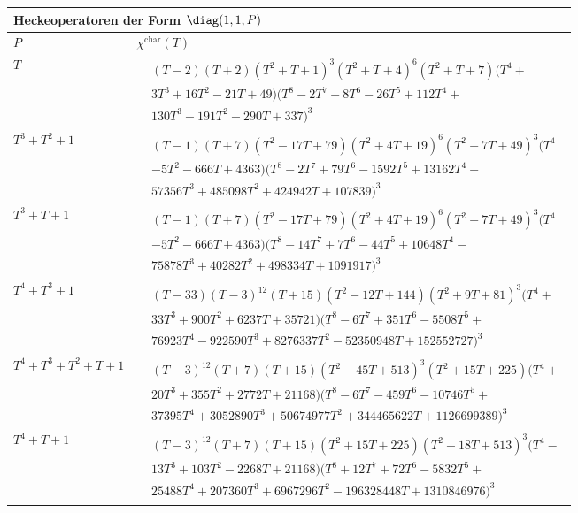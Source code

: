 \begin{tabular}{| l | l |}
\multicolumn{2}{l}{\bf Heckeoperatoren der Form $\diag(1,1,P)$} \\
\hline
$P$ & $\chi^\text{char}(T)$ \\
\hline
$T$ &
$\!\begin{aligned}
	&(T - 2)(T + 2)(T^{2} + T + 1)^{3}(T^{2} + T + 4)^{6}(T^{2} + T + 7)(T^{4} + \\&
3T^{3} + 16T^{2} - 21T + 49)(T^{8} - 2T^{7} - 8T^{6} - 26T^{5} + 112T^{4} + \\&
130T^{3} - 191T^{2} - 290T + 337)^{3}\end{aligned}$ \\
\hline
$T^3 + T^2 + 1$ &
$\!\begin{aligned}
	&(T - 1)(T + 7)(T^{2} - 17T + 79)(T^{2} + 4T + 19)^{6}(T^{2} + 7T + 49)^{3}(T^{4}\\&
- 5T^{2} - 666T + 4363)(T^{8} - 2T^{7} + 79T^{6} - 1592T^{5} + 13162T^{4} - \\&
57356T^{3} + 485098T^{2} + 424942T + 107839)^{3}\end{aligned}$ \\
\hline
$T^3 + T + 1$ &
$\!\begin{aligned}
	&(T - 1)(T + 7)(T^{2} - 17T + 79)(T^{2} + 4T + 19)^{6}(T^{2} + 7T + 49)^{3}(T^{4}\\&
- 5T^{2} - 666T + 4363)(T^{8} - 14T^{7} + 7T^{6} - 44T^{5} + 10648T^{4} - \\&
75878T^{3} + 40282T^{2} + 498334T + 1091917)^{3}\end{aligned}$ \\
\hline
$T^4 + T^3 + 1$ &
$\!\begin{aligned}
	&(T - 33)(T - 3)^{12}(T + 15)(T^{2} - 12T + 144)(T^{2} + 9T + 81)^{3}(T^{4} + \\&
33T^{3} + 900T^{2} + 6237T + 35721)(T^{8} - 6T^{7} + 351T^{6} - 5508T^{5} + \\&
76923T^{4} - 922590T^{3} + 8276337T^{2} - 52350948T + 152552727)^{3}\end{aligned}$ \\
\hline
$T^4 + T^3 + T^2 + T + 1$ &
$\!\begin{aligned}
	&(T - 3)^{12}(T + 7)(T + 15)(T^{2} - 45T + 513)^{3}(T^{2} + 15T + 225)(T^{4} + \\&
20T^{3} + 355T^{2} + 2772T + 21168)(T^{8} - 6T^{7} - 459T^{6} - 10746T^{5} + \\&
37395T^{4} + 3052890T^{3} + 50674977T^{2} + 344465622T + 1126699389)^{3}\end{aligned}$ \\
\hline
$T^4 + T + 1$ &
$\!\begin{aligned}
	&(T - 3)^{12}(T + 7)(T + 15)(T^{2} + 15T + 225)(T^{2} + 18T + 513)^{3}(T^{4} - \\&
13T^{3} + 103T^{2} - 2268T + 21168)(T^{8} + 12T^{7} + 72T^{6} - 5832T^{5} + \\&
25488T^{4} + 207360T^{3} + 6967296T^{2} - 196328448T + 1310846976)^{3}\end{aligned}$ \\
\hline
\end{tabular}


